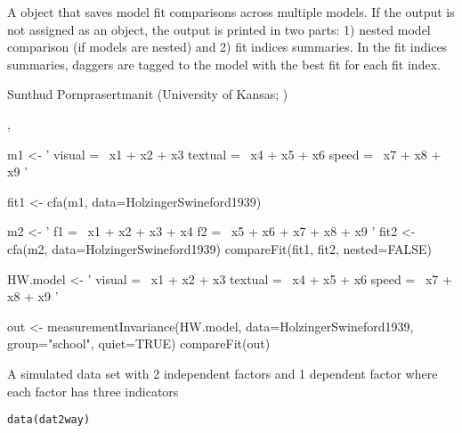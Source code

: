 \documentclass[a4paper]{book}
\begin{document}
%
\begin{Value}
A  object that saves model fit comparisons across multiple models. If the output is not assigned as an object, the output is printed in two parts: 1) nested model comparison (if models are nested) and 2) fit indices summaries. In the fit indices summaries, daggers are tagged to the model with the best fit for each fit index.
\end{Value}
%
\begin{Author}\relax
Sunthud Pornprasertmanit (University of Kansas; )
\end{Author}
%
\begin{SeeAlso}\relax
{}, 
\end{SeeAlso}
%
\begin{Examples}
\begin{ExampleCode}
m1 <- ' visual  =~ x1 + x2 + x3
        textual =~ x4 + x5 + x6
        speed   =~ x7 + x8 + x9 '

fit1 <- cfa(m1, data=HolzingerSwineford1939)

m2 <- ' f1  =~ x1 + x2 + x3 + x4 
        f2 =~ x5 + x6 + x7 + x8 + x9 '
fit2 <- cfa(m2, data=HolzingerSwineford1939)
compareFit(fit1, fit2, nested=FALSE)

HW.model <- ' visual =~ x1 + x2 + x3
              textual =~ x4 + x5 + x6
              speed =~ x7 + x8 + x9 '

out <- measurementInvariance(HW.model, data=HolzingerSwineford1939, group="school", quiet=TRUE)
compareFit(out)
\end{ExampleCode}
\end{Examples}
%
\begin{Description}\relax
A simulated data set with 2 independent factors and 1 dependent factor where each factor has three indicators 
\end{Description}
%
\begin{Usage}
\begin{verbatim}
data(dat2way)
\end{verbatim}
\end{Usage}
%
\end{document}
